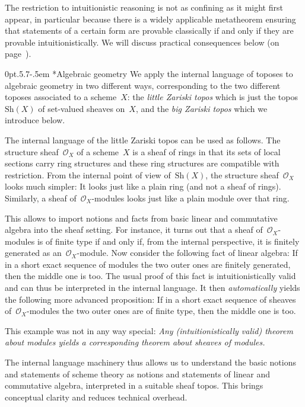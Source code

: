 \documentclass[10pt,reqno,a4paper]{amsbook}
\makeatletter
\theoremstyle{definition}
\theoremstyle{plain}
\theoremstyle{remark}
\renewcommand{\O}{\mathcal{O}}
\newcommand{\Sh}{\mathrm{Sh}}
\newcommand{\?}{\,{:}\,}
\renewcommand{\_}{\mathpunct{.}\,}
\def\subsection{\@startsection{subsection}{2}%
  {0pt}{.5\linespacing\@plus.7\linespacing}{-.5em}%
  {\normalfont\bfseries}}
\makeatother
\begin{document}
{The restriction to intuitionistic reasoning is not as confining as it might first
appear, in particular because there is a widely applicable metatheorem ensuring
that statements of a certain form are provable classically if and only if they
are provable intuitionistically. We will discuss practical consequences below (on
page~\pageref{sect:appreciating-intuitionistic-logic}).


\subsection*{Algebraic geometry}
We apply the internal language of toposes to algebraic geometry in two
different ways, corresponding to the two different toposes associated to a
scheme~$X$: the \emph{little Zariski topos} which is just the topos~$\Sh(X)$ of
set-valued sheaves on~$X$, and the \emph{big Zariski topos} which we introduce
below.

The internal language of the little Zariski topos can be used as follows.
The structure sheaf~$\O_X$ of a scheme~$X$ is a sheaf of rings in that its sets of
local sections carry ring structures and these ring structures are compatible
with restriction. From the internal point of view of~$\Sh(X)$,
the structure
sheaf~$\O_X$ looks much simpler: It looks just like a plain ring (and
not a sheaf of rings). Similarly, a sheaf of~$\O_X$-modules looks just like a
plain module over that ring.

This allows to import notions and facts from basic linear and commutative
algebra into the sheaf setting. For instance, it turns out that a sheaf
of~$\O_X$-modules is of finite type if and only if, from the internal
perspective, it is finitely generated as an~$\O_X$-module. Now consider the
following fact of linear algebra: If in a short exact sequence of modules the two
outer ones are finitely generated, then the middle one is too. The usual proof of
this fact is intuitionistically valid and can thus be interpreted in the
internal language. It then \emph{automatically} yields the following more advanced
proposition: If in a short exact sequence of sheaves of~$\O_X$-modules the
two outer ones are of finite type, then the middle one is too.

This example was not in any way special: \emph{Any (intuitionistically valid) theorem
about modules yields a corresponding theorem about sheaves of modules.}

The internal language machinery thus allows us to understand the basic notions
and statements of scheme theory as notions and statements of linear and
commutative algebra, interpreted in a suitable sheaf topos. This brings
conceptual clarity and reduces technical overhead.

}
\end{document}

